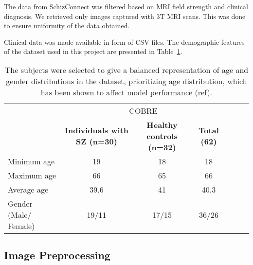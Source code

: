 The data from SchizConnect was filtered based on MRI field strength and clinical diagnosis. We retrieved only images captured with 3T MRI scans. This was done to ensure uniformity of the data obtained.

Clinical data was made available in form of CSV files. The demographic features of the dataset used in this project are presented in Table~\ref{tab:cobre_mcicshare_clinical_demographic}.



\begin{center}
	\begin{table}
        \centering
        \caption{\label{tab:cobre_mcicshare_clinical_demographic}The subjects were selected to give a balanced representation of age and gender distributions in the dataset, prioritizing age distribution, which has been shown to affect model performance (ref).}
        \begin{tabular*}{500pt}{@{\extracolsep\fill}lcccccc@{\extracolsep\fill}}
            \toprule
            & \multicolumn{3}{c}{COBRE}
            \\\cmidrule{2-4}
            & \textbf{Individuals with SZ (n=30)} & \textbf{Healthy controls (n=32)} & \textbf{Total (62)} \\
            \midrule
            Minimum age             & 19  & 18  & 18 \\
            Maximum age 		    & 66  & 65 & 66  \\
            Average age             & 39.6 & 41 & 40.3	\\
            Gender (Male/ Female)   & 19/11 & 17/15 & 36/26	\\
            \bottomrule
        \end{tabular*}
    \end{table}    
\end{center}

%
\subsection{Image Preprocessing}

